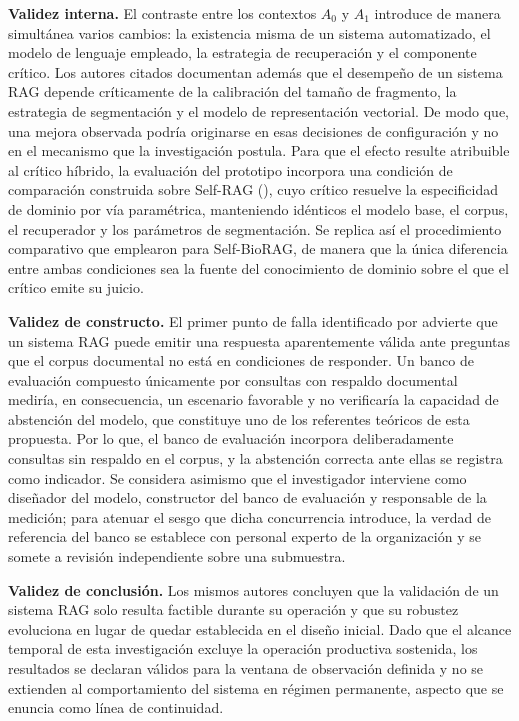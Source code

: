 \textbf{Validez interna.} El contraste entre los contextos $A_0$ y $A_1$ introduce de manera simultánea varios cambios: la existencia misma de un sistema automatizado, el modelo de lenguaje empleado, la estrategia de recuperación y el componente crítico. Los autores citados documentan además que el desempeño de un sistema RAG depende críticamente de la calibración del tamaño de fragmento, la estrategia de segmentación y el modelo de representación vectorial. De modo que, una mejora observada podría originarse en esas decisiones de configuración y no en el mecanismo que la investigación postula. Para que el efecto resulte atribuible al crítico híbrido, la evaluación del prototipo incorpora una condición de comparación construida sobre Self-RAG (\cite{Asai2024_Selfrag}), cuyo crítico resuelve la especificidad de dominio por vía paramétrica, manteniendo idénticos el modelo base, el corpus, el recuperador y los parámetros de segmentación. Se replica así el procedimiento comparativo que \textcite{jeong_improving_2024} emplearon para Self-BioRAG, de manera que la única diferencia entre ambas condiciones sea la fuente del conocimiento de dominio sobre el que el crítico emite su juicio.

\textbf{Validez de constructo.} El primer punto de falla identificado por \textcite{Barnett2024_SevenFailurePoints} advierte que un sistema RAG puede emitir una respuesta aparentemente válida ante preguntas que el corpus documental no está en condiciones de responder. Un banco de evaluación compuesto únicamente por consultas con respaldo documental mediría, en consecuencia, un escenario favorable y no verificaría la capacidad de abstención del modelo, que constituye uno de los referentes teóricos de esta propuesta. Por lo que, el banco de evaluación incorpora deliberadamente consultas sin respaldo en el corpus, y la abstención correcta ante ellas se registra como indicador. Se considera asimismo que el investigador interviene como diseñador del modelo, constructor del banco de evaluación y responsable de la medición; para atenuar el sesgo que dicha concurrencia introduce, la verdad de referencia del banco se establece con personal experto de la organización y se somete a revisión independiente sobre una submuestra.

\textbf{Validez de conclusión.} Los mismos autores concluyen que la validación de un sistema RAG solo resulta factible durante su operación y que su robustez evoluciona en lugar de quedar establecida en el diseño inicial. Dado que el alcance temporal de esta investigación excluye la operación productiva sostenida, los resultados se declaran válidos para la ventana de observación definida y no se extienden al comportamiento del sistema en régimen permanente, aspecto que se enuncia como línea de continuidad.

